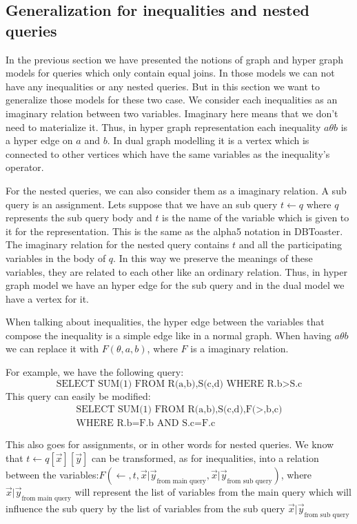 \documentclass[12pt]{article}
\begin{document}
\subsection{Generalization for inequalities and nested queries}
\label{sec:generalization}
In the previous section we have presented the notions of graph and hyper graph models for queries which only contain equal joins. In those models we can not have any inequalities or any nested queries. But in this section we want to generalize those models for these two case. We consider each inequalities as an imaginary relation between two variables. Imaginary here means that we don't need to materialize it. Thus, in hyper graph representation each inequality $a\theta b$ is a hyper edge on $a$ and $b$. In dual graph modelling it is a vertex which is connected to other vertices which have the same variables as the inequality's operator.\par
For the nested queries, we can also consider them as a imaginary relation. A sub query is an assignment. Lets suppose that we have an sub query $t\gets q$ where $q$ represents the sub query body and $t$ is the name of the variable which is given to it for the representation. This is the same as the alpha5 notation in DBToaster\cite{1}. The imaginary relation for the nested query contains $t$ and all the participating variables in the body of $q$. In this way we preserve the meanings of these variables, they are related to each other like an ordinary relation. Thus, in hyper graph model we have an hyper edge for the sub query and in the dual model we have a vertex for it.\par

When talking about inequalities, the hyper edge between the variables that compose the inequality is a simple edge like in a normal graph. When having $a\theta b$ we can replace it with $F(\theta,a,b)$, where $F$ is a imaginary relation. 

For example, we have the following query:
$$\mbox{SELECT SUM(1) FROM R(a,b),S(c,d) WHERE R.b$>$S.c}$$
This query can easily be modified:
\begin{align*}
\mbox{SELECT SUM(1) FROM R(a,b),S(c,d),F($>$,b,c)}\\\mbox{WHERE R.b=F.b AND S.c=F.c}
\end{align*}

This also goes for assignments, or in other words for nested queries. We know that $t\gets q[\vec{x}][\vec{y}]$ can be transformed, as for inequalities, into a relation between the variables:$F(\gets,t,{\vec{x}|\vec{y}}_{\mbox{from main query}},{\vec{x}|\vec{y}}_{\mbox{from sub query}})$, where ${\vec{x}|\vec{y}}_{\mbox{from main query}}$ will represent the list of variables from the main query which will influence the sub query by the list of variables from the sub query $ {\vec{x}|\vec{y}}_{\mbox{from sub query}}$
\end{document}
